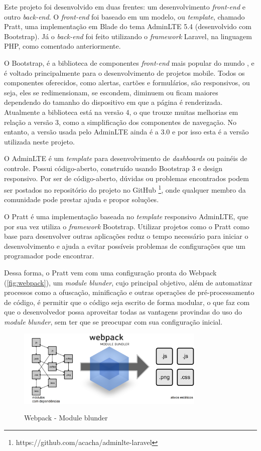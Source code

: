 \newpage
Este projeto foi desenvolvido em duas frentes: um desenvolvimento \textit{front-end} e outro \textit{back-end}. O \textit{front-end} foi baseado em um modelo, ou \textit{template}, chamado Pratt, uma implementação em Blade do tema AdminLTE 5.4 (desenvolvido com Bootstrap). Já o \textit{back-end} foi feito utilizando o \textit{framework} Laravel, na linguagem PHP, como comentado anteriormente.

O Bootstrap, é a biblioteca de componentes \textit{front-end} mais popular do mundo \cite{bootstrap}, e é voltado principalmente para o desenvolvimento de projetos mobile. Todos os componentes oferecidos, como alertas, cartões e formulários, são responsivos, ou seja, eles se redimensionam, se escondem, diminuem ou ficam maiores dependendo do tamanho do dispositivo em que a página é renderizada. Atualmente a biblioteca está na versão 4, o que trouxe muitas melhorias em relação a versão 3, como a simplificação dos componentes de navegação. No entanto, a versão usada pelo AdminLTE ainda é a 3.0 e por isso esta é a versão utilizada neste projeto.

O AdminLTE é um \textit{template} para desenvolvimento de \textit{dashboards} ou painéis de controle. Possui código-aberto, construído usando Bootstrap 3 e design responsivo. Por ser de código-aberto, dúvidas ou problemas encontrados podem ser postados no repositório do projeto no GitHub
\footnote{https://github.com/acacha/adminlte-laravel}, onde qualquer membro da comunidade pode prestar ajuda e propor soluções.

O Pratt é uma implementação baseada no \textit{template} responsivo AdminLTE, que por sua vez utiliza o \textit{framework} Bootstrap. Utilizar projetos como o Pratt como base para desenvolver outras aplicações reduz o tempo necessário para iniciar o desenvolvimento e ajuda a evitar possíveis problemas de configurações que um programador pode encontrar. 

Dessa forma, o Pratt vem com uma configuração pronta do Webpack (\autoref{fig:webpack}), um \textit{module blunder}, cujo principal objetivo, além de automatizar processos como a ofuscação, minificação e outras operações de pré-processamento de código, é permitir que o código seja escrito de forma modular, o que faz com que o desenvolvedor possa aproveitar todas as vantagens provindas do uso do \textit{module blunder}, sem ter que se preocupar com sua configuração inicial.

\begin{figure}[H]
    \centering
    \caption{Webpack - Module blunder}
    \includegraphics[width=0.8\textwidth]{./dados/figuras/fig17}
    \label{fig:webpack}
\end{figure}

